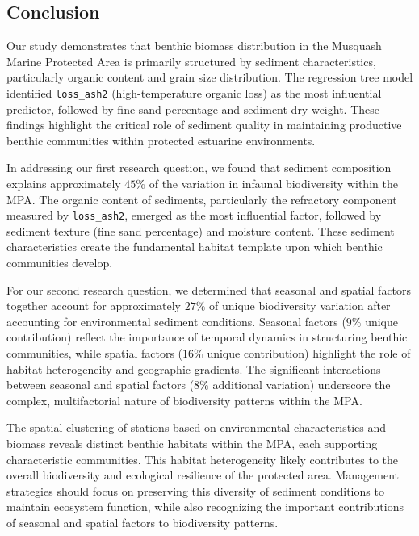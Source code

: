 \documentclass[12pt]{article}
\begin{document}
\subsection{Conclusion}

\qquad Our study demonstrates that benthic biomass distribution in the Musquash
Marine Protected Area is primarily structured by sediment characteristics,
particularly organic content and grain size distribution. The regression tree
model identified \texttt{loss\_ash2} (high-temperature organic loss) as the most
influential predictor, followed by fine sand percentage and sediment dry weight.
These findings highlight the critical role of sediment quality in maintaining
productive benthic communities within protected estuarine environments.

\qquad In addressing our first research question, we found that sediment
composition explains approximately $45\%$ of the variation in infaunal
biodiversity within the MPA. The organic content of sediments, particularly the
refractory component measured by \texttt{loss\_ash2}, emerged as the most
influential factor, followed by sediment texture (fine sand percentage) and
moisture content. These sediment characteristics create the fundamental habitat
template upon which benthic communities develop.

\qquad For our second research question, we determined that seasonal and spatial
factors together account for approximately $27\%$ of unique biodiversity
variation after accounting for environmental sediment conditions. Seasonal
factors ($9\%$ unique contribution) reflect the importance of temporal dynamics
in structuring benthic communities, while spatial factors ($16\%$ unique
contribution) highlight the role of habitat heterogeneity and geographic
gradients. The significant interactions between seasonal and spatial factors
($8\%$ additional variation) underscore the complex, multifactorial nature of
biodiversity patterns within the MPA.

\qquad The spatial clustering of stations based on environmental characteristics
and biomass reveals distinct benthic habitats within the MPA, each supporting
characteristic communities. This habitat heterogeneity likely contributes to the
overall biodiversity and ecological resilience of the protected area. Management
strategies should focus on preserving this diversity of sediment conditions to
maintain ecosystem function, while also recognizing the important contributions
of seasonal and spatial factors to biodiversity patterns.
\end{document}
